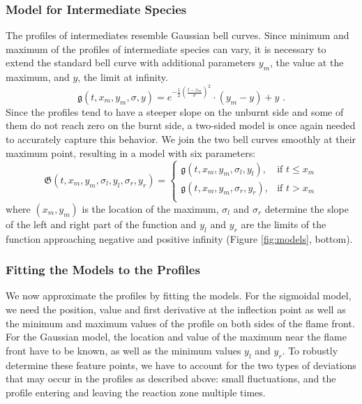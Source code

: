 \subsubsection{Model for Intermediate Species} %
\label{ssub:model_for_intermediate_species}
%
The profiles of intermediates resemble Gaussian bell curves. Since minimum and
maximum of the profiles of intermediate species can vary, it is necessary to
extend the standard bell curve with additional parameters $y_m$, the value at
the maximum, and $y$, the limit at infinity.
%
\begin{equation*}
	\mathfrak{g}(t, x_m, y_m, \sigma, y)
		= e^{-\frac{1}{2}(\frac{t-x_m}{\sigma})^2}\cdot(y_m-y)+y \text{ .}
\end{equation*}
%
Since the profiles tend to have a steeper slope on the unburnt side and some of
them do not reach zero on the burnt side, a two-sided model is once again needed
to accurately capture this behavior. We join the two bell curves smoothly at
their maximum point, resulting in a model with six parameters:
%
\begin{equation*}
	\mathfrak{G}(t, x_m, y_m, \sigma_l, y_l, \sigma_r, y_r) =
	\begin{cases}
		\mathfrak{g}(t, x_m, y_m, \sigma_l, y_l), & \text{if }  t \leq x_m\\
		\mathfrak{g}(t, x_m, y_m, \sigma_r, y_r), & \text{if }  t > x_m\\
	\end{cases}
\end{equation*}
%
where $(x_m, y_m)$ is the location of the maximum, $\sigma_l$ and $\sigma_r$
determine the slope of the left and right part of the function and $y_l$ and
$y_r$ are the limits of the function approaching negative and positive infinity
(Figure \ref{fig:models}, bottom).
%
% 	
%
%
\subsubsection{Fitting the Models to the Profiles} %
\label{ssub:fitting_the_models}
%
We now approximate the profiles by fitting the models. For the sigmoidal model,
we need the position, value and first derivative at the inflection point as well
as the minimum and maximum values of the profile on both sides of the flame
front. For the Gaussian model, the location and value of the maximum near the
flame front have to be known, as well as the minimum values $y_l$ and $y_r$. To
robustly determine these feature points, we have to account for the two types of
deviations that may occur in the profiles as described above: small
fluctuations, and the profile entering and leaving the reaction zone multiple
times.

